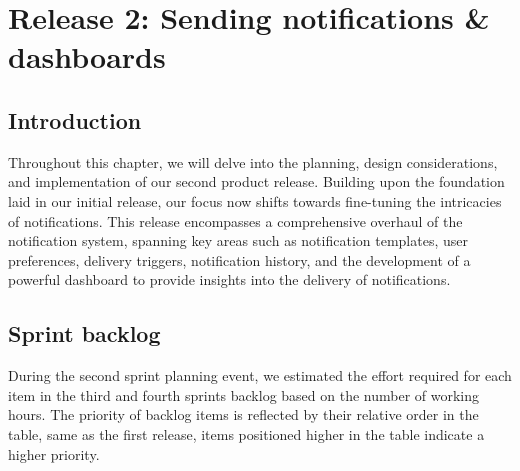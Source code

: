 \chapter{Release 2: Sending notifications \& dashboards}

\section*{Introduction}
Throughout this chapter, we will delve into the planning, design considerations, and implementation of our
second product release. Building upon the foundation laid in our initial release, our focus now shifts
towards fine-tuning the intricacies of notifications. This release encompasses a comprehensive overhaul
of the notification system, spanning key areas such as notification templates, user preferences, delivery
triggers, notification history, and the development of a powerful dashboard to provide insights into
the delivery of notifications.

\section{Sprint backlog}
During the second sprint planning event, we estimated the effort required for each item in the third and
fourth sprints backlog based on the number of working hours. The priority of backlog items is reflected
by their relative order in the table, same as the first release, items positioned higher in the table
indicate a higher priority. \\

